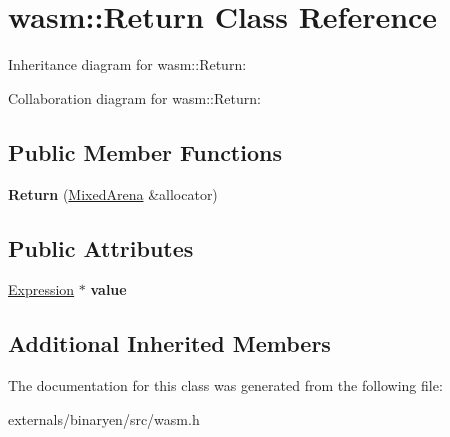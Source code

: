 \hypertarget{classwasm_1_1_return}{}\section{wasm\+:\+:Return Class Reference}
\label{classwasm_1_1_return}


Inheritance diagram for wasm\+:\+:Return\+:


Collaboration diagram for wasm\+:\+:Return\+:
\subsection*{Public Member Functions}
\begin{DoxyCompactItemize}
\item 
\mbox{\label{classwasm_1_1_return_a22176d6f3d0411593ab78c90ddf3bd2f}} 
{\bfseries Return} (\mbox{\hyperlink{struct_mixed_arena}{Mixed\+Arena}} \&allocator)
\end{DoxyCompactItemize}
\subsection*{Public Attributes}
\begin{DoxyCompactItemize}
\item 
\mbox{\label{classwasm_1_1_return_a64610a4b0067ddcf0c97bffdd6f9763b}} 
\mbox{\hyperlink{classwasm_1_1_expression}{Expression}} $\ast$ {\bfseries value}
\end{DoxyCompactItemize}
\subsection*{Additional Inherited Members}


The documentation for this class was generated from the following file\+:\begin{DoxyCompactItemize}
\item 
externals/binaryen/src/wasm.\+h\end{DoxyCompactItemize}
